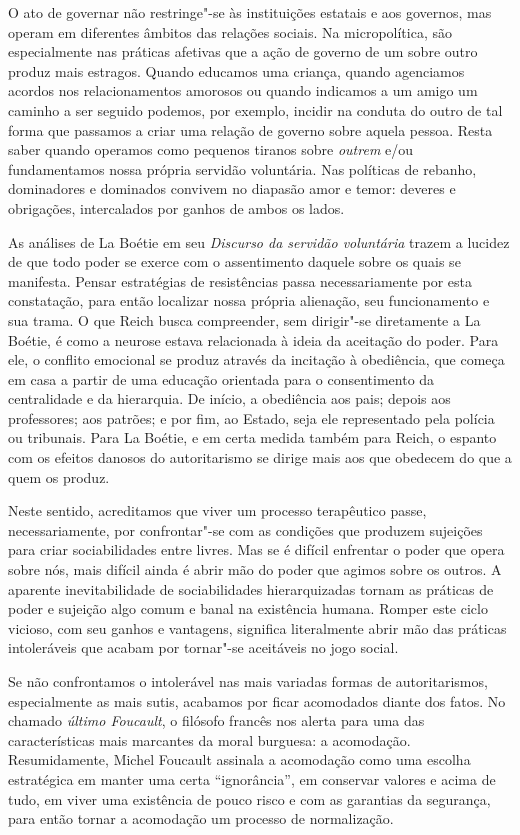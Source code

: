 O ato de governar não restringe"-se às instituições estatais e aos
governos, mas operam em diferentes âmbitos das relações sociais. Na
micropolítica, são especialmente nas práticas afetivas que a ação de
governo de um sobre outro produz mais estragos. Quando educamos uma
criança, quando agenciamos acordos nos relacionamentos amorosos ou
quando indicamos a um amigo um caminho a ser seguido podemos, por
exemplo, incidir na conduta do outro de tal forma que passamos a criar
uma relação de governo sobre aquela pessoa. Resta saber quando operamos
como pequenos tiranos sobre \emph{outrem} e/ou fundamentamos nossa
própria servidão voluntária. Nas políticas de rebanho, dominadores e
dominados convivem no diapasão amor e temor: deveres e obrigações,
intercalados por ganhos de ambos os lados.

As análises de La Boétie em seu \emph{Discurso da servidão voluntária}
trazem a lucidez de que todo poder se exerce com o assentimento daquele
sobre os quais se manifesta. Pensar estratégias de resistências passa
necessariamente por esta constatação, para então localizar nossa própria
alienação, seu funcionamento e sua trama. O que Reich busca compreender,
sem dirigir"-se diretamente a La Boétie, é como a neurose estava
relacionada à ideia da aceitação do poder. Para ele, o conflito
emocional se produz através da incitação à obediência, que começa em
casa a partir de uma educação orientada para o consentimento da
centralidade e da hierarquia. De início, a obediência aos pais; depois
aos professores; aos patrões; e por fim, ao Estado, seja ele
representado pela polícia ou tribunais. Para La Boétie, e em certa
medida também para Reich, o espanto com os efeitos danosos do
autoritarismo se dirige mais aos que obedecem do que a quem os produz.

Neste sentido, acreditamos que viver um processo terapêutico passe,
necessariamente, por confrontar"-se com as condições que produzem
sujeições para criar sociabilidades entre livres. Mas se é difícil
enfrentar o poder que opera sobre nós, mais difícil ainda é abrir mão do
poder que agimos sobre os outros. A aparente inevitabilidade de
sociabilidades hierarquizadas tornam as práticas de poder e sujeição
algo comum e banal na existência humana. Romper este ciclo
vicioso, com seu ganhos e vantagens, significa literalmente abrir mão
das práticas intoleráveis que acabam por tornar"-se aceitáveis no jogo
social.

Se não confrontamos o intolerável nas mais variadas formas de
autoritarismos, especialmente as mais sutis, acabamos por ficar
acomodados diante dos fatos. No chamado \emph{último Foucault}, o %
filósofo francês nos alerta para uma das características mais marcantes
da moral burguesa: a acomodação. Resumidamente, Michel Foucault assinala
a acomodação como uma escolha estratégica em manter uma certa
``ignorância'', em conservar valores e acima de tudo, em viver uma
existência de pouco risco e com as garantias da segurança, para então
tornar a acomodação um processo de normalização.

